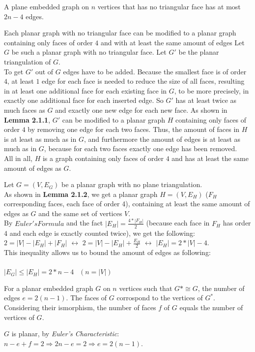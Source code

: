 \documentclass[a4paper]{article}
\begin{document}
\begin{solution}{19}
\begin{theorem} {A plane embedded graph on $n$ vertices that has no triangular face has at most $2n-4$ edges.}
			\begin{lemma} {Each planar graph with no triangular face can be modified to a planar graph containing only faces of order $4$  and with at least the same amount of edges}
				Let $G$ be such a planar graph with no triangular face. Let $G'$ be the planar triangulation of $G$.\\
				To get $G'$ out of $G$ edges have to be added. Because the smallest face is of order $4$, at least $1$ edge for each face is needed to reduce the size of all faces, resulting in at least one additional face for each existing face in $G$, to be more precisely, in exactly one additional face for each inserted edge. So $G'$ has at least twice as much faces as $G$ and exactly one new edge for each new face. As shown in \textbf{Lemma 2.1.1}, $G'$ can be modified to a planar graph $H$ containing only faces of order $4$ by removing one edge for each two faces. Thus, the amount of faces in $H$ is at least as much as in $G$, and furthermore the amount of edges is at least as much as in $G$, because for each two faces exactly one edge has been removed.\\
				All in all, $H$ is a graph containing only faces of order $4$ and has at least the same amount of edges as $G$.
			\end{lemma}		
			
	
			Let $G=(V,E_G)$ be a planar graph with no plane triangulation.\\
			As shown in \textbf{Lemma 2.1.2}, we get a planar graph $H=(V,E_H)$ ($F_H$ corresponding faces, each face of order 4), containing at least the same amount of edges as $G$ and the same set of vertices $V$.\\
			
			By $Euler's Formula$ and the fact $|E_H|= \frac{4 * |F_H|}{2}$ (because each face in $F_H$ has order 4 and each edge is exactly counted twice), we get the following:\\
			$2 = |V| - |E_H| +|F_H|$ $\leftrightarrow$ $2 = |V| - |E_H| + \frac{E_H}{2}$ $\leftrightarrow$ $|E_H| = 2 * |V| - 4$.\\
			This inequality allows us to bound the amount of edges as following:\\\\
			$|E_G| \leq |E_H| = 2 * n - 4$   $~~(n=|V|)$
			
		\end{theorem}
	\end{solution}
	\newpage
	\begin{solution}{20}
		\begin{theorem}{For a planar embedded graph $G$ on $n$ vertices such that $G* \cong G$, the number of edges $e = 2(n - 1)$.}
			The faces of $G$ corrospond to the vertices of $G^*$. Considering their ismorphism, the number of faces $f$ of $G$ equals the number of vertices of $G$.
			
			$G$ is planar, by \emph{Euler's Characteristic}: $n - e + f = 2 \Rightarrow 2n - e = 2 \Rightarrow e = 2(n-1)$.
		\end{theorem}
	\end{solution}
	
\end{document}
